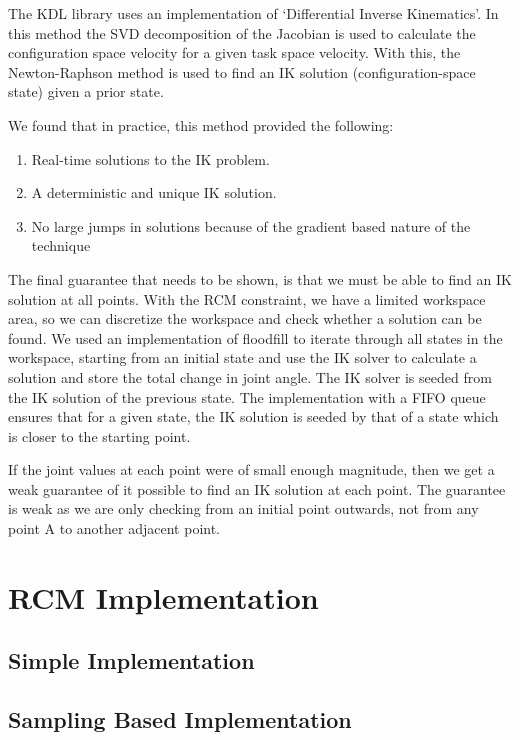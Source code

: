 \documentclass[BTech]{iitmdiss}
\begin{document}
    The KDL library uses an implementation of `Differential Inverse Kinematics'.
    In this method the SVD decomposition of the Jacobian is used to calculate the configuration space velocity for a given task space velocity.
    With this, the Newton-Raphson method is used to find an IK solution (configuration-space state) given a prior state.

    We found that in practice, this method provided the following:
    \begin{enumerate}
        \item Real-time solutions to the IK problem.
        \item A deterministic and unique IK solution.
        \item No large jumps in solutions because of the gradient based nature of the technique
    \end{enumerate}

    The final guarantee that needs to be shown, is that we must be able to find an IK solution at all points.
    With the RCM constraint, we have a limited workspace area, so we can discretize the workspace and check whether a
    solution can be found.
    We used an implementation of floodfill to iterate through all states in the workspace, starting from an initial state
    and use the IK solver to calculate a solution and store the total change in joint angle.
    The IK solver is seeded from the IK solution of the previous state.
    The implementation with a FIFO queue ensures that for a given state, the IK solution is seeded by that of a state which is closer to the starting point.

    If the joint values at each point were of small enough magnitude, then we get a weak guarantee of it possible to find an IK solution at each point.
    The guarantee is weak as we are only checking from an initial point outwards, not from any point A to another adjacent point.


    \section{RCM Implementation}

    \subsection{Simple Implementation}

    \subsection{Sampling Based Implementation}
\end{document}
